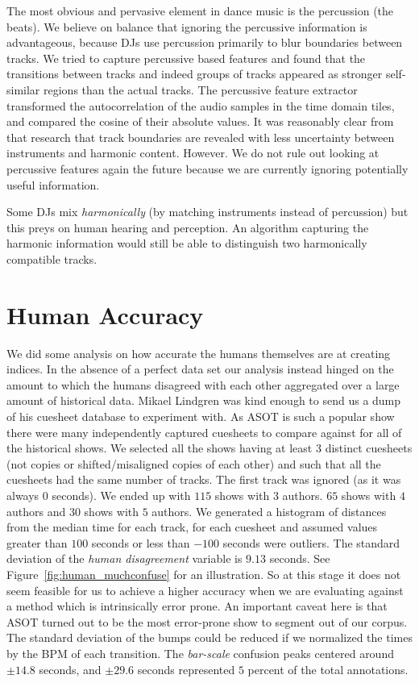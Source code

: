 \documentclass[twocolumn]{article}
\begin{document}
	The most obvious and pervasive element in dance music is the percussion (the beats). We believe on balance that ignoring the percussive information is advantageous, because DJs use percussion primarily to blur boundaries between tracks.  We tried to capture percussive based features and found that the transitions between tracks and indeed groups of tracks appeared as stronger self-similar regions than the actual tracks. The percussive feature extractor transformed the autocorrelation of the audio samples in the time domain tiles, and compared the cosine of their absolute values. It was reasonably clear from that research that track boundaries are revealed with less uncertainty between instruments and harmonic content. However. We do not rule out looking at percussive features again the future because we are currently ignoring potentially useful information.
	
	Some DJs mix \textit{harmonically} (by matching instruments instead of percussion) but this preys on human hearing and perception. An algorithm capturing the harmonic information would still be able to distinguish two harmonically compatible tracks. 
	
	\section{Human Accuracy}\label{human_acc}
	
	We did some analysis on how accurate the humans themselves are at creating indices. In the absence of a perfect data set our analysis instead hinged on the amount to which the humans disagreed with each other aggregated over a large amount of historical data. Mikael Lindgren was kind enough to send us a dump of his cuesheet database to experiment with. As ASOT is such a popular show there were many independently captured cuesheets to compare against for all of the historical shows. We selected all the shows having at least $3$ distinct cuesheets (not copies or shifted/misaligned copies of each other)  and such that all the cuesheets had the same number of tracks. The first track was ignored (as it was always $0$ seconds). We ended up with $115$ shows with $3$ authors. $65$ shows with $4$ authors and $30$ shows with $5$ authors.  We generated a histogram of distances from the median time for each track, for each cuesheet and assumed values greater than $100$ seconds or less than $-100$ seconds were outliers. The standard deviation of the \textit{human disagreement} variable is $9.13$ seconds. See Figure~\ref{fig:human_muchconfuse} for an illustration. So at this stage it does not seem feasible for us to achieve a higher accuracy when we are evaluating against a method which is intrinsically error prone. An important caveat here is that ASOT turned out to be the most error-prone show to segment out of our corpus. The standard deviation of the bumps could be reduced if we normalized the times by the BPM of each transition. The \textit{bar-scale} confusion peaks centered around $\pm14.8$ seconds, and $\pm29.6$ seconds represented $5$ percent of the total annotations.
	
\end{document}
